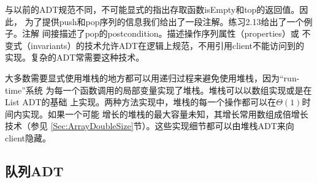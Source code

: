 与以前的ADT规范不同，不可能显式的指出存取函数isEmpty和top的返回值。因此，
为了提供push和pop序列的信息我们给出了一段注解。练习2.13给出了一个例子。注解
间接描述了pop的postcondition。描述操作序列属性（properties）或
不变式（invariants）的技术允许ADT在逻辑上规范，不用引用client不能访问到的
实现。复杂的ADT常需要这种技术。

大多数需要显式使用堆栈的地方都可以用递归过程来避免使用堆栈，因为“run-time”系统
为每一个函数调用的局部变量实现了堆栈。堆栈可以以数组实现或是在List ADT的基础
上实现。两种方法实现中，堆栈的每一个操作都可以在$\Theta(1)$时间内实现。如果一个可能
增长的堆栈的最大容量未知，其增长常用数组成倍增长技术（参见
\ref{Sec:ArrayDoubleSize}节）。这些实现细节都可以由堆栈ADT来向client隐藏。

\subsection{队列ADT}\label{Sec:QueueADT}

